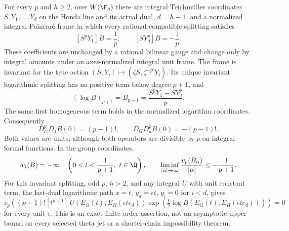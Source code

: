 \begin{theorem}\label{DP38}
For every $p$ and $h\ge2$, over $W(\F_q)$ there are integral Teichm\"uller coordinates $S,Y_1,\ldots,Y_d$ on the Honda line and its actual dual, $d=h-1$, and a normalized integral Poincar\'e frame in which every rational compatible splitting satisfies
\[
 [S^pY_1]B=\frac1p,\qquad [SY_d^p]B=-\frac1p.
\]
These coefficients are unchanged by a rational bilinear gauge and change only by integral amounts under an axes-normalized integral unit frame. The frame is invariant for the true action $(S,Y_i)\mapsto(\zeta S,\zeta^{-p^i}Y_i)$. Its unique invariant logarithmic splitting has no positive term below degree $p+1$, and
\begin{equation}\label{eq:primitive-first}
 (\log B)_{p+1}=B_{p+1}=\frac{S^pY_1-SY_d^p}{p}.
\end{equation}
The same first homogeneous term holds in the normalized logarithm coordinates. Consequently
\[
 D_G^pD_1 B(0)=(p-1)!,\qquad D_GD_d^p B(0)=-(p-1)!.
\]
Both values are units, although both operators are divisible by $p$ on integral formal functions. In the group coordinates,
\[
 w_t(B)=-\infty\quad\left(0<t<\frac1{p+1},\ t\in\Q\right),\qquad
 \liminf_{|\alpha|\to\infty}\frac{v_p(B_\alpha)}{|\alpha|}\le-\frac1{p+1}.
\]
For this invariant splitting, odd $p$, $h>2$, and any integral $U$ with unit constant term, the last-dual logarithmic path $x=t$, $y_d=\epsilon t$, $y_i=0$ for $i<d$, gives
\begin{equation}\label{eq:primitive-path-unit}
 v_p\left((p+1)![t^{p+1}]\,
 U(E_G(t),E_H(\epsilon te_d))
 \exp\left(\tfrac12\log B(E_G(t),E_H(\epsilon te_d))\right)\right)=0
\end{equation}
for every unit $\epsilon$. This is an exact finite-order assertion, not an asymptotic upper bound on every selected theta jet or a shorter-chain impossibility theorem.
\end{theorem}
